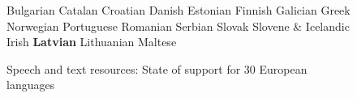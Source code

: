 \begin{figure}[b]
\begin{tabular}
Bulgarian \newline 
Catalan \newline 
Croatian \newline 
Danish \newline 
Estonian \newline 
Finnish \newline 
Galician \newline 
Greek \newline 
Norwegian \newline 
Portuguese \newline 
Romanian \newline 
Serbian \newline 
Slovak \newline 
Slovene
&  \vspace*{0.5mm}
    Icelandic \newline 
 Irish \newline 
 \textbf{Latvian} \newline 
Lithuanian \newline 
 Maltese \\
  \end{tabular}
  \caption{Speech and text resources: State of support for 30 European languages}  
   \label{fig:resources_cluster_en}
\end{figure}

\clearpage


